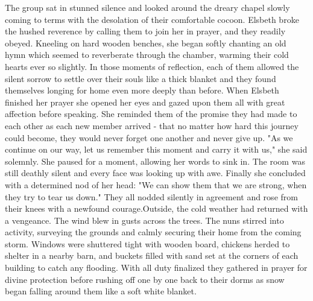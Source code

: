 \documentclass[11pt]{article}
\begin{document}
The group sat in stunned silence and looked around the dreary chapel slowly coming to terms with the desolation of their comfortable cocoon. Elsbeth broke the hushed reverence by calling them to join her in prayer, and they readily obeyed. Kneeling on hard wooden benches, she began softly chanting an old hymn which seemed to reverberate through the chamber, warming their cold hearts ever so slightly. In those moments of reflection, each of them allowed the silent sorrow to settle over their souls like a thick blanket and they found themselves longing for home even more deeply than before.
When Elsbeth finished her prayer she opened her eyes and gazed upon them all with great affection before speaking. She reminded them of the promise they had made to each other as each new member arrived - that no matter how hard this journey could become, they would never forget one another and never give up.
"As we continue on our way, let us remember this moment and carry it with us," she said solemnly. She paused for a moment, allowing her words to sink in. The room was still deathly silent and every face was looking up with awe. Finally she concluded with a determined nod of her head: "We can show them that we are strong, when they try to tear us down."
They all nodded silently in agreement and rose from their knees with a newfound courage.Outside, the cold weather had returned with a vengeance. The wind blew in gusts across the trees. The nuns stirred into activity, surveying the grounds and calmly securing their home from the coming storm. Windows were shuttered tight with wooden board, chickens herded to shelter in a nearby barn, and buckets filled with sand set at the corners of each building to catch any flooding. With all duty finalized they gathered in prayer for divine protection before rushing off one by one back to their dorms as snow began falling around them like a soft white blanket.
\end{document}
